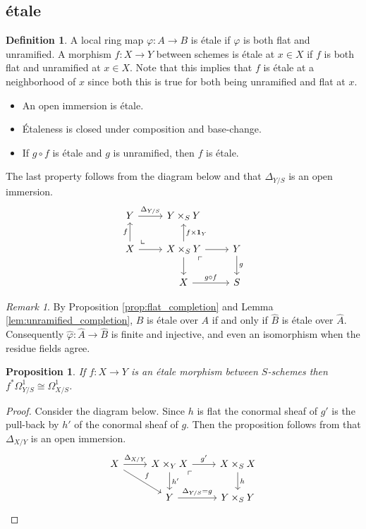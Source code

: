 \documentclass[leqno]{amsart}
\newcommand{\id}{\mathbf{1}}
\newcommand{\1}{\mathbf{1}}
\newtheorem{prop}[thm]{Proposition}
\theoremstyle{definition}
\newtheorem{defn}[thm]{Definition}
\theoremstyle{remark}
\newtheorem{rem}[thm]{Remark}
\begin{document}
\subsection{\'{e}tale}

\begin{defn}
	A local ring map $\varphi\colon A\to B$ 
	is \'{e}tale if  $\varphi$ is both flat and unramified.
	A morphism $f\colon X\to Y$ between schemes
	is \'{e}tale at $x\in X$ 
	if $f$ is both flat and unramified at $x\in X$.
	Note that this implies that $f$ is \'{e}tale at a 
	neighborhood of $x$ since both this is true
	for both being unramified and flat at $x$.
	\begin{itemize}
		\item An open immersion is \'{e}tale.
		\item \'{E}taleness is closed under 
			composition and base-change.
		\item If $g\circ f$ is \'{e}tale and 
			$g$ is unramified, then  $f$ is \'{e}tale.
	\end{itemize}
	The last property follows from the diagram below
	and that $\Delta_{Y/S}$ is an open immersion.
	\[
	\begin{tikzcd}
		Y\arrow[r,"\Delta_{Y/S}"]& Y\times_SY&\\
		X\arrow[ur, phantom, "\llcorner", very near start]
		\arrow[u,"f"]\arrow[r]& 
		X\times_SY\arrow[u,"f\times\id_Y",swap]
		\arrow[dr, phantom, "\ulcorner", very near start]
		\arrow[d]\arrow[r]&Y\arrow[d,"g"]\\
		&X\arrow[r,"g\circ f"]&S
	\end{tikzcd}
	\]
\end{defn}

\begin{rem}
	By Proposition \ref{prop:flat_completion}
	and Lemma \ref{lem:unramified_completion},
	$B$ is \'{e}tale over $A$ if and only if
	$\hat{B}$ is \'{e}tale over $\hat{A}$.
	Consequently 
	$\hat{\varphi}\colon \hat{A}\to\hat{B}$
	is finite and injective,
	and even an isomorphism
	when the residue fields agree.
\end{rem}

\begin{prop}
	If $f:X\to Y$ is an \'{e}tale morphism
	between  $S$-schemes 
	then $f^*\Omega^1_{Y/S}\cong \Omega^1_{X/S}$.
\end{prop}
\begin{proof}
	Consider the diagram below.
	Since $h$ is flat
	the conormal sheaf of  $g'$ is
	the pull-back by $h'$ of the conormal sheaf of  $g$.
	Then the proposition follows from that 
	$\Delta_{X/Y}$ is an open immersion.
	\[
		\begin{tikzcd}
			X\arrow[r,"\Delta_{X/Y}"]
			\arrow[dr,"f"] &
			X\times_YX
			\arrow[dr, phantom, "\ulcorner", 
			very near start]
			\arrow[r,"g'"]
			\arrow[d,"h'"] &
			X\times_SX \arrow[d,"h"]\\
		   & Y\arrow[r,"\Delta_{Y/S}=g"] &
		   Y\times_SY
		\end{tikzcd}
	\]
\end{proof}
\end{document}
